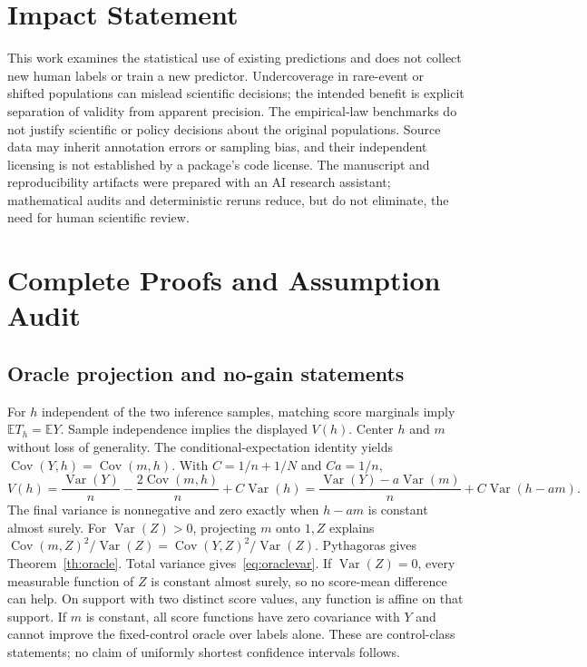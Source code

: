 \documentclass{article}
\newcommand{\E}{\mathbb{E}}
\newcommand{\Var}{\operatorname{Var}}
\newcommand{\Cov}{\operatorname{Cov}}
\begin{document}
\section*{Impact Statement}
This work examines the statistical use of existing predictions and does not collect new human labels or train a new predictor. Undercoverage in rare-event or shifted populations can mislead scientific decisions; the intended benefit is explicit separation of validity from apparent precision. The empirical-law benchmarks do not justify scientific or policy decisions about the original populations. Source data may inherit annotation errors or sampling bias, and their independent licensing is not established by a package's code license. The manuscript and reproducibility artifacts were prepared with an AI research assistant; mathematical audits and deterministic reruns reduce, but do not eliminate, the need for human scientific review.




\clearpage
\onecolumn
\appendix
\section{Complete Proofs and Assumption Audit}
\label{app:proofs}
\subsection{Oracle projection and no-gain statements}
For $h$ independent of the two inference samples, matching score marginals imply $\E T_h=\E Y$. Sample independence implies the displayed $V(h)$. Center $h$ and $m$ without loss of generality. The conditional-expectation identity yields $\Cov(Y,h)=\Cov(m,h)$. With $C=1/n+1/N$ and $Ca=1/n$,
\[
 V(h)=\frac{\Var(Y)}n-\frac{2\Cov(m,h)}n+C\Var(h)
 =\frac{\Var(Y)-a\Var(m)}n+C\Var(h-am).
\]
The final variance is nonnegative and zero exactly when $h-am$ is constant almost surely. For $\Var(Z)>0$, projecting $m$ onto $1,Z$ explains $\Cov(m,Z)^2/\Var(Z)=\Cov(Y,Z)^2/\Var(Z)$. Pythagoras gives Theorem~\ref{th:oracle}. Total variance gives~\eqref{eq:oraclevar}. If $\Var(Z)=0$, every measurable function of $Z$ is constant almost surely, so no score-mean difference can help. On support with two distinct score values, any function is affine on that support. If $m$ is constant, all score functions have zero covariance with $Y$ and cannot improve the fixed-control oracle over labels alone. These are control-class statements; no claim of uniformly shortest confidence intervals follows.
\end{document}
